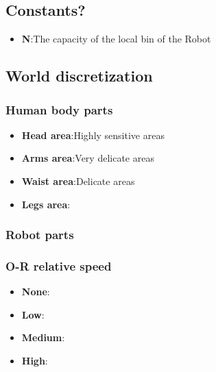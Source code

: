 \documentclass[a4paper]{article}
\begin{document}
\subsection{Constants?}
\begin{itemize}
    \item \textbf{N}:\@ The capacity of the local bin of the Robot
\end{itemize}
\subsection{World discretization}

\subsubsection{Human body parts}
\begin{itemize}
    \item \textbf{Head area}:\@ Highly sensitive areas
    \item \textbf{Arms area}:\@ Very delicate areas
    \item \textbf{Waist area}:\@ Delicate areas
    \item \textbf{Legs area}:\@ 
\end{itemize}

\subsubsection{Robot parts}

\subsubsection{O-R relative speed}
\begin{itemize}
    \item \textbf{None}:\@ 
    \item \textbf{Low}:\@ 
    \item \textbf{Medium}:\@ 
    \item \textbf{High}:\@ 
\end{itemize}
\end{document}
